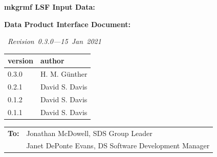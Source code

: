 \documentclass[twoside]{article}
\newcommand{\Revision}{\mbox{\em%
Revision 0.3.0---15 Jan 2021 %
}}
\begin{document}
\begin{titlepage}
\begin{center}
    {\LARGE\bf mkgrmf LSF Input Data:}

    \vspace*{.2in}
    {\LARGE\bf Data Product Interface Document:}
    \vspace*{.2in}
    
    \Revision
    
    \vfill

    \begin{tabular}{|l|l|}
      \hline
      version & author\\\hline\hline
      0.3.0 & H. M. G\"unther\\\hline
      0.2.1 & David S. Davis\\\hline
      0.1.2 & David S. Davis\\\hline
      0.1.1 & David S. Davis\\\hline
    \end{tabular}
  \end{center}
  \begin{tabular}{ll}
    \textbf{To:} & Jonathan McDowell, SDS Group Leader\\
    & Janet DePonte Evans, DS Software Development Manager\\
    \end{tabular}

\end{titlepage}


\setcounter{page}{2}

\end{document}
